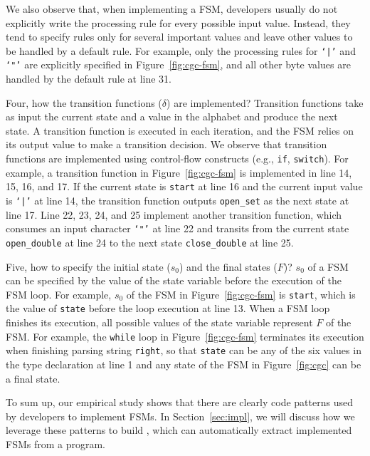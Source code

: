 We also observe that, when implementing a FSM,
developers usually do not explicitly write the processing rule for every possible
input value. Instead,
they tend to specify rules only for several important values and leave other values to be handled by a default rule.
For example, only the processing rules for \texttt{`|'} and \texttt{`"'}
are explicitly specified in Figure~\ref{fig:cgc-fsm},
and all other byte values are handled by
the default rule at line 31.

Four, how the transition functions ($\delta$) are implemented?
Transition functions take as input the current state and a value
in the alphabet and produce the next state.
A transition function is executed in each iteration,
and the FSM relies on its output value to make a transition decision.
We observe that transition functions are implemented
using control-flow constructs (e.g., \texttt{if}, \texttt{switch}).
For example, a transition function in Figure~\ref{fig:cgc-fsm}
is implemented in line 14, 15, 16, and 17.
If the current state is \texttt{start}
at line 16 and the current input value is
\texttt{`|'} at line 14, the transition function outputs \texttt{open\_set}
as the next state at line 17.
Line 22, 23, 24, and 25 implement another transition function,
which consumes an input character \texttt{`"'} at line 22 and
transits from the current state
\texttt{open\_double} at line 24 to
the next state \texttt{close\_double} at line 25.

Five, how to specify the initial state ($s_0$) and the final states ($F$)?
$s_0$ of a FSM can be specified
by the value of the state variable before the execution of the FSM loop.
For example,  $s_0$ of the FSM in Figure~\ref{fig:cgc-fsm}
is \texttt{start}, which is the value of \texttt{state}
before the loop execution at line 13.
When a FSM loop finishes its execution,
all possible values of the state variable
represent $F$ of the FSM.
For example, the \texttt{while} loop in Figure~\ref{fig:cgc-fsm} terminates
its execution when finishing parsing string \texttt{right},
so that \texttt{state} can be any of the six values
in the type declaration at line 1
and any state of the FSM in
Figure~\ref{fig:cgc} can be a final state.


To sum up, our empirical study shows that
there are clearly code patterns used by developers to implement FSMs.
In Section~\ref{sec:impl}, we will discuss how we
leverage these patterns to build \Tool{},
which can automatically extract implemented FSMs from a program.





